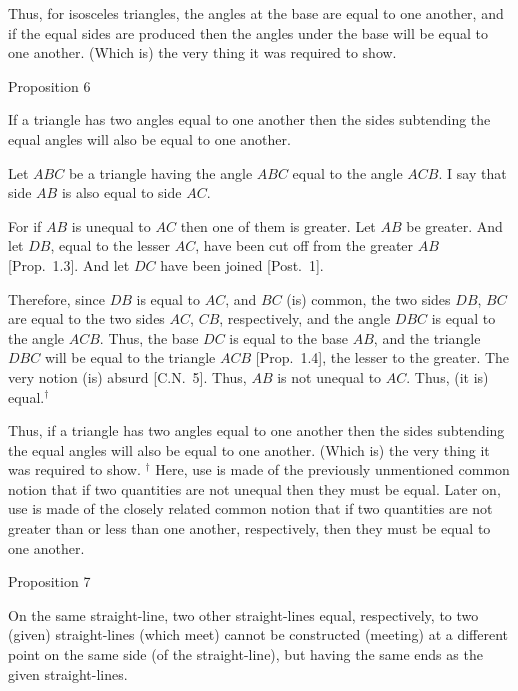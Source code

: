 Thus, for isosceles triangles, the angles at the base are equal to one another, and if
the equal sides are produced then the angles under the base will be equal to one another. (Which is) the very thing it was required to show.


\begin{center}
{\large Proposition 6}
\end{center}

If a triangle has two angles equal to one another then the sides subtending the
equal angles will also be equal to one another.

\epsfysize=1.75in
\centerline{}

Let $ABC$ be a triangle having the angle $ABC$ equal to the angle $ACB$. I say that
side $AB$ is also equal to side $AC$.

For if $AB$ is unequal to $AC$ then one of them is greater. Let $AB$ be greater. And
let $DB$, equal to the lesser $AC$, have been cut off from the greater $AB$ [Prop.~1.3].  And
let $DC$ have been joined [Post.~1].

Therefore, since $DB$ is equal to $AC$, and $BC$ (is) common, the two sides $DB$, $BC$ are equal to the two sides $AC$, $CB$, respectively, and the angle $DBC$
is equal to the angle $ACB$. Thus, the base $DC$ is equal to the base
$AB$, and the triangle $DBC$ will be equal to the triangle $ACB$ [Prop.~1.4], the lesser
to the greater. The very notion (is) absurd [C.N.~5]. Thus, $AB$ is not unequal
to $AC$. Thus, (it is) equal.$^\dag$

Thus, if a triangle has two angles equal to one another then the sides subtending the
equal angles will also be equal to one another. (Which is) the very thing it was required to show.
{\footnotesize \noindent $^\dag$ Here, use is made of the previously
unmentioned common notion that if two quantities are not unequal then they must be equal. Later on, use is made of the closely related common notion
that if two quantities are not greater than or less than one another, respectively, then they must be equal to one another.}


\begin{center}
{\large Proposition 7}
\end{center}

On the same straight-line, two other straight-lines 
equal, respectively, to 
two (given) straight-lines (which meet) cannot be constructed (meeting)
at  a different point on the same
side (of the straight-line), but having the same ends as the given straight-lines.

